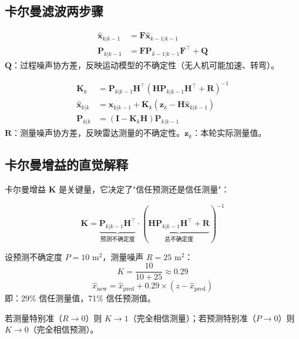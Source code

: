 \documentclass[12pt, a4paper]{article}
\newcommand{\mat}[1]{\boldsymbol{#1}}
\begin{document}
\subsection{卡尔曼滤波两步骤}

\begin{keybox}
\begin{align}
\hat{\mat{x}}_{k|k-1} &= \mat{F}\hat{\mat{x}}_{k-1|k-1} \tag{状态预测}\\
\mat{P}_{k|k-1} &= \mat{F}\mat{P}_{k-1|k-1}\mat{F}^\top + \mat{Q} \tag{协方差预测}
\end{align}
$\mat{Q}$：过程噪声协方差，反映运动模型的不确定性（无人机可能加速、转弯）。
\end{keybox}

\begin{keybox}
\begin{align}
\mat{K}_k &= \mat{P}_{k|k-1}\mat{H}^\top \left(\mat{H}\mat{P}_{k|k-1}\mat{H}^\top + \mat{R}\right)^{-1} \tag{卡尔曼增益}\\
\hat{\mat{x}}_{k|k} &= \hat{\mat{x}}_{k|k-1} + \mat{K}_k\left(\mat{z}_k - \mat{H}\hat{\mat{x}}_{k|k-1}\right) \tag{状态更新}\\
\mat{P}_{k|k} &= \left(\mat{I} - \mat{K}_k\mat{H}\right)\mat{P}_{k|k-1} \tag{协方差更新}
\end{align}
$\mat{R}$：测量噪声协方差，反映雷达测量的不确定性。$\mat{z}_k$：本轮实际测量值。
\end{keybox}

\subsection{卡尔曼增益的直觉解释}

卡尔曼增益 $\mat{K}$ 是关键量，它决定了"信任预测还是信任测量"：

\begin{equation}
\mat{K} = \underbrace{\mat{P}_{k|k-1}\mat{H}^\top}_{\text{预测不确定度}} \cdot \left(\underbrace{\mat{H}\mat{P}_{k|k-1}\mat{H}^\top + \mat{R}}_{\text{总不确定度}}\right)^{-1}
\end{equation}

\begin{intubox}
设预测不确定度 $P = 10\text{ m}^2$，测量噪声 $R = 25\text{ m}^2$：
\[ K = \frac{10}{10 + 25} \approx 0.29 \]
\[ \hat{x}_\text{new} = \hat{x}_\text{pred} + 0.29 \times (z - \hat{x}_\text{pred}) \]
即：29\% 信任测量值，71\% 信任预测值。

若测量特别准（$R \to 0$）则 $K \to 1$（完全相信测量）；若预测特别准（$P \to 0$）则 $K \to 0$（完全相信预测）。
\end{intubox}
\end{document}

